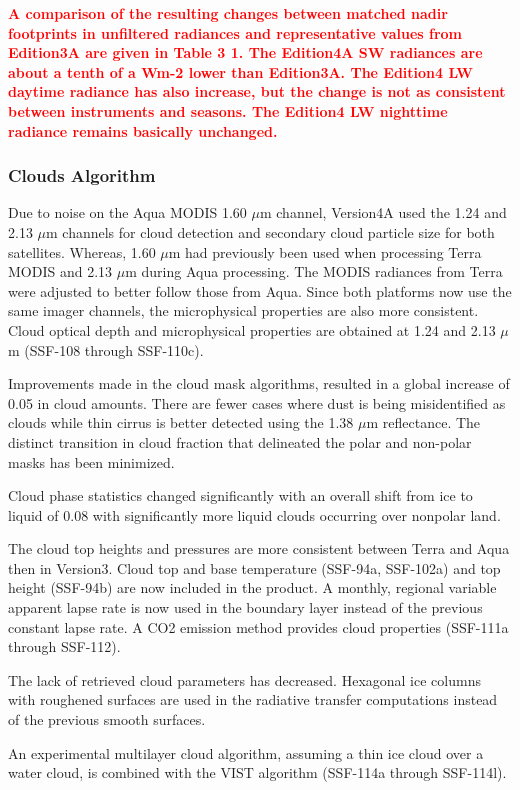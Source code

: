 \documentclass[12pt]{article}
\begin{document}
\textcolor{red}{\bf A comparison of the resulting changes between matched nadir footprints in unfiltered radiances and representative values from Edition3A are given in Table 3 1. The Edition4A SW radiances are about a tenth of a Wm-2 lower than Edition3A. The Edition4 LW daytime radiance has also increase, but the change is not as consistent between instruments and seasons. The Edition4 LW nighttime radiance remains basically unchanged. }


\subsubsection{Clouds Algorithm}
Due to noise on the Aqua MODIS 1.60 $\mu$m channel, Version4A used the 1.24 and 2.13 $\mu$m channels for cloud detection and secondary cloud particle size for both satellites. Whereas, 1.60 $\mu$m had previously been used when processing Terra MODIS and 2.13 $\mu$m during Aqua processing. The MODIS radiances from Terra were adjusted to better follow those from Aqua. Since both platforms now use the same imager channels, the microphysical properties are also more consistent. Cloud optical depth and microphysical properties are obtained at 1.24 and 2.13 $\mu$m (SSF-108 through SSF-110c).

Improvements made in the cloud mask algorithms, resulted in a global increase of 0.05 in cloud amounts. There are fewer cases where dust is being misidentified as clouds while thin cirrus is better detected using the 1.38 $\mu$m reflectance. The distinct transition in cloud fraction that delineated the polar and non-polar masks has been minimized.

Cloud phase statistics changed significantly with an overall shift from ice to liquid of 0.08 with significantly more liquid clouds occurring over nonpolar land.

The cloud top heights and pressures are more consistent between Terra and Aqua then in Version3. Cloud top and base temperature (SSF-94a, SSF-102a) and top height (SSF-94b) are now included in the product. A monthly, regional variable apparent lapse rate is now used in the boundary layer instead of the previous constant lapse rate. A CO2 emission method provides cloud properties (SSF-111a through SSF-112).

The lack of retrieved cloud parameters has decreased. Hexagonal ice columns with roughened surfaces are used in the radiative transfer computations instead of the previous smooth surfaces.

An experimental multilayer cloud algorithm, assuming a thin ice cloud over a water cloud, is combined with the VIST algorithm (SSF-114a through SSF-114l).  
\end{document}
